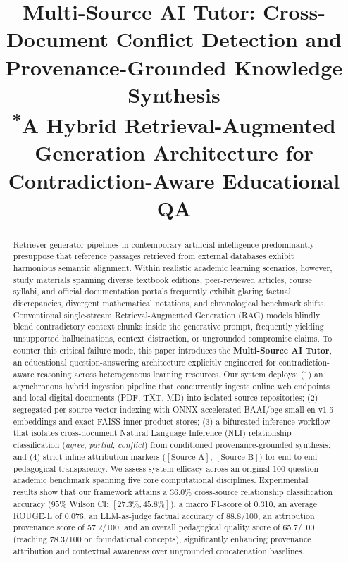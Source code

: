 \documentclass[conference]{IEEEtran}
\begin{document}
\title{Multi-Source AI Tutor: Cross-Document Conflict Detection and Provenance-Grounded Knowledge Synthesis\\
{\footnotesize \textsuperscript{*}A Hybrid Retrieval-Augmented Generation Architecture for Contradiction-Aware Educational QA}
}
\author{
}
\maketitle

\begin{abstract}
Retriever-generator pipelines in contemporary artificial intelligence predominantly presuppose that reference passages retrieved from external databases exhibit harmonious semantic alignment. Within realistic academic learning scenarios, however, study materials spanning diverse textbook editions, peer-reviewed articles, course syllabi, and official documentation portals frequently exhibit glaring factual discrepancies, divergent mathematical notations, and chronological benchmark shifts. Conventional single-stream Retrieval-Augmented Generation (RAG) models blindly blend contradictory context chunks inside the generative prompt, frequently yielding unsupported hallucinations, context distraction, or ungrounded compromise claims. To counter this critical failure mode, this paper introduces the \textbf{Multi-Source AI Tutor}, an educational question-answering architecture explicitly engineered for contradiction-aware reasoning across heterogeneous learning resources. Our system deploys: (1) an asynchronous hybrid ingestion pipeline that concurrently ingests online web endpoints and local digital documents (PDF, TXT, MD) into isolated source repositories; (2) segregated per-source vector indexing with ONNX-accelerated BAAI/bge-small-en-v1.5 embeddings and exact FAISS inner-product stores; (3) a bifurcated inference workflow that isolates cross-document Natural Language Inference (NLI) relationship classification (\textit{agree}, \textit{partial}, \textit{conflict}) from conditioned provenance-grounded synthesis; and (4) strict inline attribution markers ($[\text{Source A}]$, $[\text{Source B}]$) for end-to-end pedagogical transparency. We assess system efficacy across an original 100-question academic benchmark spanning five core computational disciplines. Experimental results show that our framework attains a 36.0\% cross-source relationship classification accuracy ($95\%$ Wilson CI: $[27.3\%, 45.8\%]$), a macro F1-score of 0.310, an average ROUGE-L of 0.076, an LLM-as-judge factual accuracy of 88.8/100, an attribution provenance score of 57.2/100, and an overall pedagogical quality score of 65.7/100 (reaching 78.3/100 on foundational concepts), significantly enhancing provenance attribution and contextual awareness over ungrounded concatenation baselines.
\end{abstract}
\end{document}
